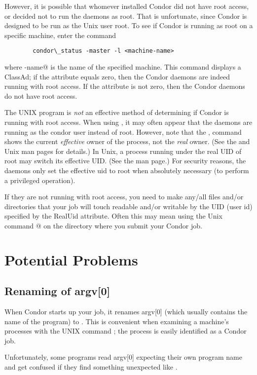 However, it is possible that whomever installed Condor 
did not have root access, or
decided not to run the daemons as root.
That is unfortunate,
since Condor is designed to be run as the Unix user root.
To see if Condor is
running as root on a specific machine, enter the command
\begin{verbatim}
        condor\_status -master -l <machine-name>
\end{verbatim}

where \verb@machine-name@ is the name of the specified machine.
This command displays a  ClassAd; if the
attribute  equals zero,
then the Condor daemons are indeed
running with root access.  If the
 attribute is not zero, then the Condor daemons do not have
root access.

\Note The UNIX program 
is \emph{not} an effective
method of determining if Condor is running with root access.
When using ,
it may often appear that the daemons are
running as the condor user instead of root.
However, note that the ,
command shows the current \emph{effective} owner of the
process, not the \emph{real} owner.  (See the  and
 Unix man pages for details.)  In Unix, a process
running under the real UID of root may switch its effective UID.
(See the  man page.)
For security reasons, the daemons
only set the effective uid to root when absolutely necessary
(to perform a privileged operation).

If they are not running with root access, you need to make any/all files
and/or directories that your job will touch readable and/or writable by
the UID (user id) specified by the RealUid attribute.
Often this may
mean using the Unix command @
on the directory where you submit your Condor job.

\section{Potential Problems}

\subsection{Renaming of argv[0]}

When Condor starts up your job, it renames argv[0] (which usually
contains the name of the program) to .
This is
convenient when examining a machine's processes with the UNIX
command ; the process
is easily identified as a Condor job.  

Unfortunately, some programs read argv[0] expecting their own program
name and get confused if they find something unexpected like
.

